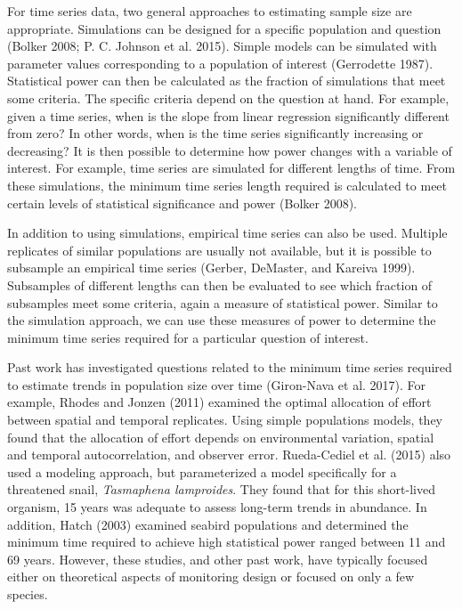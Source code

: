 \documentclass[12pt,]{article}
\begin{document}
For time series data, two general approaches to estimating sample size
are appropriate. Simulations can be designed for a specific population
and question (Bolker 2008; P. C. Johnson et al. 2015). Simple models can
be simulated with parameter values corresponding to a population of
interest (Gerrodette 1987). Statistical power can then be calculated as
the fraction of simulations that meet some criteria. The specific
criteria depend on the question at hand. For example, given a time
series, when is the slope from linear regression significantly different
from zero? In other words, when is the time series significantly
increasing or decreasing? It is then possible to determine how power
changes with a variable of interest. For example, time series are
simulated for different lengths of time. From these simulations, the
minimum time series length required is calculated to meet certain levels
of statistical significance and power (Bolker 2008).

In addition to using simulations, empirical time series can also be
used. Multiple replicates of similar populations are usually not
available, but it is possible to subsample an empirical time series
(Gerber, DeMaster, and Kareiva 1999). Subsamples of different lengths
can then be evaluated to see which fraction of subsamples meet some
criteria, again a measure of statistical power. Similar to the
simulation approach, we can use these measures of power to determine the
minimum time series required for a particular question of interest.

Past work has investigated questions related to the minimum time series
required to estimate trends in population size over time (Giron-Nava et
al. 2017). For example, Rhodes and Jonzen (2011) examined the optimal
allocation of effort between spatial and temporal replicates. Using
simple populations models, they found that the allocation of effort
depends on environmental variation, spatial and temporal
autocorrelation, and observer error. Rueda-Cediel et al. (2015) also
used a modeling approach, but parameterized a model specifically for a
threatened snail, \emph{Tasmaphena lamproides}. They found that for this
short-lived organism, 15 years was adequate to assess long-term trends
in abundance. In addition, Hatch (2003) examined seabird populations and
determined the minimum time required to achieve high statistical power
ranged between 11 and 69 years. However, these studies, and other past
work, have typically focused either on theoretical aspects of monitoring
design or focused on only a few species.
\end{document}
